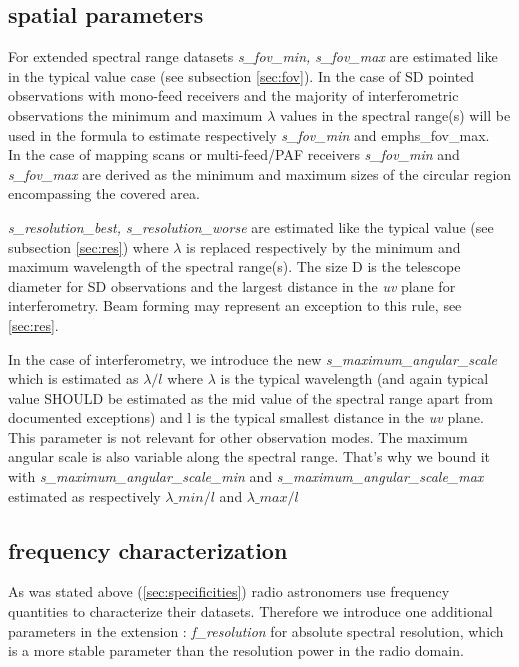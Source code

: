 \documentclass[11pt,a4paper]{ivoa}
\begin{document}
\subsection{spatial parameters}

For extended spectral range datasets \emph{s\_fov\_min, s\_fov\_max} are estimated like in the typical value case (see subsection \ref{sec:fov}).  
In the case of SD pointed observations with mono-feed receivers and the majority of interferometric observations the minimum and maximum
$\lambda$ values in the spectral range(s) will be used in the formula to estimate respectively \emph{s\_fov\_min} and  emph{s\_fov\_max}. \\
In the case of mapping scans or multi-feed/PAF receivers \emph{ s\_fov\_min} and \emph{s\_fov\_max} are derived as the minimum and maximum sizes of the 
circular region encompassing the covered area.


\emph{s\_resolution\_best, s\_resolution\_worse} are estimated like the typical value (see subsection \ref{sec:res}) where $\lambda$ is replaced respectively by the minimum and maximum wavelength of the spectral range(s). The size D is the telescope diameter for SD observations and the largest distance in the \emph{uv} plane for interferometry. Beam forming may represent an exception to this rule, see \ref{sec:res}.

In the case of interferometry, we introduce the new \emph{s\_maximum\_angular\_scale} which is estimated as $\lambda/l$ where $\lambda$ is the typical
wavelength (and again typical value SHOULD be estimated as the mid value of the spectral range apart from documented exceptions) and l is the typical smallest distance in the \emph{uv} plane. This parameter is not relevant for other observation modes.
The maximum angular scale is also variable along the spectral range. That's why we bound it with \emph{s\_maximum\_angular\_scale\_min} and \emph{s\_maximum\_angular\_scale\_max} estimated as  respectively $\lambda\_min/l$ and  $\lambda\_max/l$



\subsection{frequency characterization}

As was stated above (\ref{sec:specificities}) radio astronomers use frequency quantities to characterize their datasets. Therefore we introduce one additional parameters in the extension : 
\emph{f\_resolution} for absolute spectral resolution, which is a more stable parameter than the resolution power in the radio domain.
\end{document}
